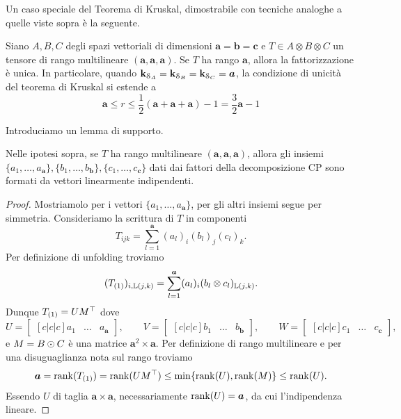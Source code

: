 Un caso speciale del Teorema di Kruskal, dimostrabile con tecniche analoghe a quelle viste sopra è
la seguente.
\begin{proposition}
	Siano $ A,B,C $ degli spazi vettoriali di dimensioni $ \bm{a} = \bm{b} = \bm{c} $ e $ T \in A \otimes B \otimes C$ un tensore di rango
	multilineare $ (\bm{a},\bm{a},\bm{a}) $. Se $ T $ ha rango $ \bm{a} $, allora la fattorizzazione è unica.
	In particolare, quando $ \mathbf{k}_{\mathcal{S}_A} = \mathbf{k}_{\mathcal{S}_B} = \mathbf{k}_{\mathcal{S}_C} = \bm{a} $, la condizione di unicità del teorema di Kruskal si
	estende a
	\begin{equation*}
		\bm{a} \le r \le \frac{1}{2}(\bm{a} + \bm{a} + \bm{a}) -1 = \frac{3}{2}\bm{a} - 1
	\end{equation*}
\end{proposition}
Introduciamo un lemma di supporto.
\begin{lemma}
	\label{lhm:multilin_unfolding}
	Nelle ipotesi sopra, se $ T $ ha rango multilineare $ (\bm{a},\bm{a},\bm{a}) $, allora gli insiemi $
		\{a_1, \ldots, a_{\bm{a}}\} , \{b_1 ,\ldots, b_{\bm{b}}\}, \{c_1, \ldots, c_{\bm{c}}\}   $ dati
	dai fattori della decomposizione CP sono formati da vettori linearmente indipendenti.
\end{lemma}
\begin{proof}
	Mostriamolo per i vettori $ \{a_{1}, \ldots, a_{\bm{a}}\}  $, per gli altri insiemi segue per simmetria.
	Consideriamo la scrittura di $ T $ in componenti
	\begin{equation}
		T_{ijk} = \sum_{l=1}^{\bm{a}} (a_{l})_{i} (b_{l})_{j} (c_{l})_{k}.
	\end{equation}
	Per definizione di unfolding troviamo
	\begin{equation}
		(\Tm{T}{1})_{i, \L(j,k)} = \sum_{l=1}^{\bm{a}} (a_{l})_{i} (b_{l} \otimes c_{l})_{\L(j,k)}.
	\end{equation}
	Dunque $ \Tm{T}{1} = UM^{\top} $ dove
	\begin{equation*}
		U =  \begin{bmatrix}[c|c|c]
			a_1 & \dots & a_{\bm{a}}
		\end{bmatrix}, \qquad
		V =  \begin{bmatrix}[c|c|c]
			b_1 & \dots & b_{\bm{b}}
		\end{bmatrix}, \qquad
		W =  \begin{bmatrix}[c|c|c]
			c_1 & \dots & c_{\bm{c}}
		\end{bmatrix},
	\end{equation*}
	e $ M = B \mathbin{\odot} C $ è una matrice $ \bm{a}^2 \times \bm{a} $.
	Per definizione di rango multilineare e per una disuguaglianza nota sul rango troviamo
	\begin{equation*}
		\bm{a} = \rank(\Tm{T}{1}) = \rank(UM^{\top}) \le \min \{\rank(U), \rank(M)\} \le \rank(U).
	\end{equation*}
	Essendo $ U $ di taglia $ \bm{a} \times \bm{a} $, necessariamente $ \operatorname{rank}(U) = \bm{a} $, da cui
	l'indipendenza lineare.
\end{proof}
